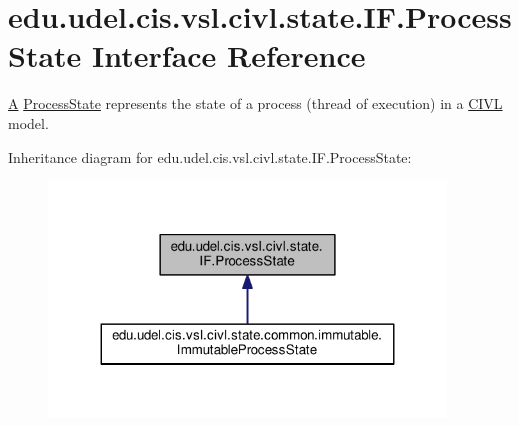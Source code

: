 \hypertarget{interfaceedu_1_1udel_1_1cis_1_1vsl_1_1civl_1_1state_1_1IF_1_1ProcessState}{}\section{edu.\+udel.\+cis.\+vsl.\+civl.\+state.\+I\+F.\+Process\+State Interface Reference}
\label{interfaceedu_1_1udel_1_1cis_1_1vsl_1_1civl_1_1state_1_1IF_1_1ProcessState}


\hyperlink{structA}{A} \hyperlink{interfaceedu_1_1udel_1_1cis_1_1vsl_1_1civl_1_1state_1_1IF_1_1ProcessState}{Process\+State} represents the state of a process (thread of execution) in a \hyperlink{classedu_1_1udel_1_1cis_1_1vsl_1_1civl_1_1CIVL}{C\+I\+V\+L} model.  




Inheritance diagram for edu.\+udel.\+cis.\+vsl.\+civl.\+state.\+I\+F.\+Process\+State\+:
\nopagebreak
\begin{figure}[H]
\begin{center}
\leavevmode
\includegraphics[width=299pt]{interfaceedu_1_1udel_1_1cis_1_1vsl_1_1civl_1_1state_1_1IF_1_1ProcessState__inherit__graph}
\end{center}
\end{figure}

